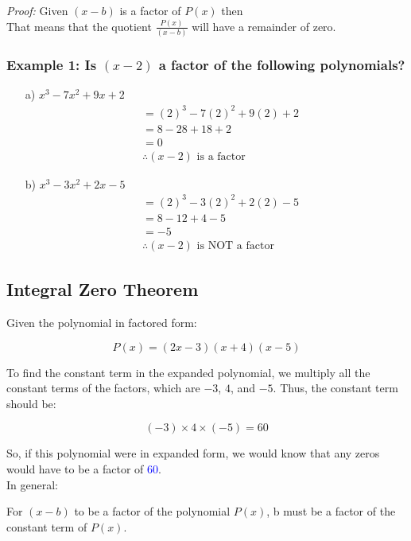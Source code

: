 \documentclass{article}
\begin{document}
\textit{Proof:} Given $(x-b)$ is a factor of $P(x)$ then\\
That means that the quotient $\frac{P(x)}{(x-b)}$ will have a remainder of zero.


\subsubsection*{Example 1: Is $(x-2)$ a factor of the following polynomials?} 
\begin{enumerate}
    \item[a)] $x^3-7x^2+9x+2$ 
    \begin{align*}
        &=(2)^3-7(2)^2+9(2)+2\\
        &=8-28+18+2\\
        &=0\\
        &\therefore \text{$(x-2)$ is a factor}
    \end{align*}
    \item[b)] $x^3-3x^2+2x-5$
    \begin{align*}
        &=(2)^3-3(2)^2+2(2)-5\\
        &=8-12+4-5\\
        &=-5\\
        &\therefore \text{$(x-2)$ is NOT a factor}
    \end{align*}
\end{enumerate}

\subsection*{Integral Zero Theorem}

Given the polynomial in factored form:

\[ P(x) = (2x - 3)(x + 4)(x - 5) \]

To find the constant term in the expanded polynomial, we multiply all the constant terms of the factors, which are \( -3 \), \( 4 \), and \( -5 \). Thus, the constant term should be:

\[ (-3) \times 4 \times (-5) = 60 \]

So, if this polynomial were in expanded form, we would know that any zeros would have to be a factor of \textcolor{blue}{60}. \\

In general:
\begin{tcolorbox}[colback=red!5!white,colframe=red!75!black]
For $(x-b)$  to be a factor of the polynomial $P(x)$, b must be
a factor of the constant term of $P(x)$.
\end{tcolorbox}
\end{document}
